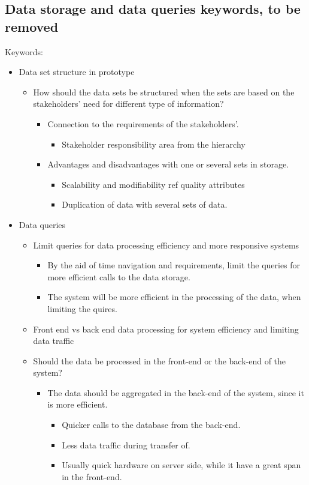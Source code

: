 \subsection{Data storage and data queries keywords, to be removed} %
\label{sub:data_storage_and_data_queries_keywords}
Keywords:
\begin{itemize}
	\item Data set structure in prototype
	\begin{itemize}
		\item How should the data sets be structured when the sets are based 
		on the stakeholders' need for different type of information?
		\begin{itemize}
			\item Connection to the requirements of the stakeholders'.
			\begin{itemize}
				\item Stakeholder responsibility area from the hierarchy
			\end{itemize}
			\item Advantages and disadvantages with one or several sets in storage.
			\begin{itemize}
				\item Scalability and modifiability ref quality attributes \cite{Bass:2012:SAP:2392670}
				\item Duplication of data with several sets of data.
			\end{itemize}
		\end{itemize}
	\end{itemize}
	\item Data queries
	\begin{itemize}
		\item Limit queries for data processing efficiency 
		and more responsive systems
		\begin{itemize}
			\item By the aid of time navigation and requirements, limit the 
			queries for more efficient calls to the data storage.
			\item The system will be more efficient in the processing of the 
			data, when limiting the quires.
		\end{itemize}
		\item Front end vs back end data processing for system efficiency and
		limiting data traffic
		\item Should the data be processed in the front-end or the back-end 
		of the system?
		\begin{itemize}
			\item The data should be aggregated in the back-end of the system, 
			since it is more efficient.
			\begin{itemize}
				\item Quicker calls to the database from the back-end.
				\item Less data traffic during transfer of.
				\item Usually quick hardware on server side, while it have a 
				great span in the front-end.
			\end{itemize}
		\end{itemize}
	\end{itemize}
\end{itemize}


